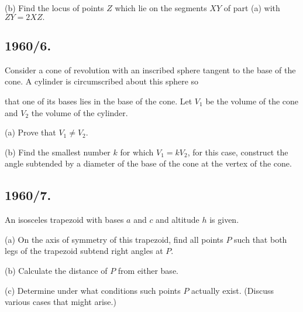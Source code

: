 \documentclass[12pt,thmsa]{article}
\begin{document}
(b) Find the locus of points $Z$ which lie on the segments $XY$ of part (a)
with $ZY=2XZ.$

\subsection{1960/6. }

Consider a cone of revolution with an inscribed sphere tangent to the base
of the cone. A cylinder is circumscribed about this sphere so

that one of its bases lies in the base of the cone. Let $V_{1}$ be the
volume of the cone and $V_{2}$ the volume of the cylinder.

(a) Prove that $V_{1}\neq V_{2}$. 

(b) Find the smallest number $k$ for which $V_{1}=kV_{2}$, for this case,
construct the angle subtended by a diameter of the base of the cone at the
vertex of the cone.

\subsection{1960/7.}

An isosceles trapezoid with bases $a$ and $c$ and altitude $h$ is given.

(a) On the axis of symmetry of this trapezoid, find all points $P$ such that
both legs of the trapezoid subtend right angles at $P.$

(b) Calculate the distance of $P$ from either base. 

(c) Determine under what conditions such points $P$ actually exist. (Discuss
various cases that might arise.)
\end{document}
